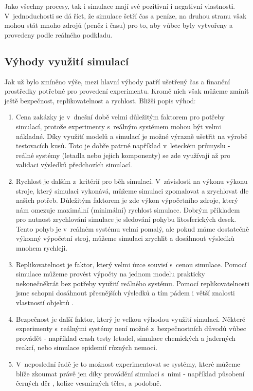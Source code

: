 Jako všechny procesy, tak i simulace mají své pozitivní i negativní vlastnosti. V~jednoduchosti se dá říct, že simulace šetří čas a peníze, na druhou stranu však mohou stát mnoho zdrojů (peněz i času) pro to, aby vůbec byly vytvořeny a provedeny podle reálného podkladu.

\subsection*{Výhody využití simulací}
\label{vyhody}
Jak už bylo zmíněno výše, mezi hlavní výhody patří  ušetřený čas a finanční prostředky potřebné pro provedení experimentu. Kromě nich však můžeme zmínit ještě bezpečnost, replikovatelnost a rychlost. Bližší popis výhod:

\begin{enumerate}
    \item Cena zakázky je v~dnešní době velmi důležitým faktorem pro potřeby simulací, protože experimenty s~reálným systémem mohou být velmi nákladné. Díky využití modelů a simulací je možné výrazně ušetřit na výrobě testovacích kusů. Toto je dobře patrné například v~leteckém průmyslu - reálné systémy (letadla nebo jejich komponenty) se zde využívají až pro validaci výsledků předchozích simulací.
    \item Rychlost je dalším z~kritérií pro běh simulací. V~závislosti na výkonu výkonu stroje, který simulaci vykonává, můžeme simulaci zpomalovat a zrychlovat dle našich potřeb. Důležitým faktorem je zde výkon výpočetního zdroje, který nám omezuje maximální (minimální) rychlost simulace. Dobrým příkladem pro nutnost zrychlování simulace je sledování pohybu litosferických desek. Tento pohyb je v~reálném systému velmi pomalý, ale pokud máme dostatečně výkonný výpočetní stroj, můžeme simulaci zrychlit a dosáhnout výsledků mnohem rychleji.
    \item Replikovatelnost je faktor, který velmi úzce souvisí s~cenou simulace. Pomocí simulace můžeme provést výpočty na jednom modelu prakticky nekonečněkrát bez potřeby využití reálného systému. Pomocí replikovatelnosti jsme schopni dosáhnout přesnějších výsledků a tím pádem i větší znalosti vlastností objektů \cite{belanger2010and}.
    \item Bezpečnost je další faktor, který je velkou výhodou využití simulací. Některé experimenty s~reálnými systémy není možné z~bezpečnostních důvodů vůbec provádět - například crash testy letadel, simulace chemických a jaderných reakcí, nebo simulace epidemií různých nemocí.
    \item V~neposlední řadě je to možnost experimentovat se systémy, které můžeme blíže zkoumat právě jen díky provádění simulací s~nimi - například působení černých děr \cite{Fragile_2007}, kolize vesmírných těles, a podobně.
\end{enumerate}


